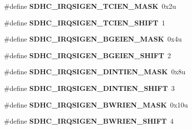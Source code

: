 \begin{DoxyCompactItemize}
\item 
\hypertarget{group___s_d_h_c___register___masks_ga18f4e41f80857c3a86c3ee99dad7fef0}{}\#define {\bfseries S\+D\+H\+C\+\_\+\+I\+R\+Q\+S\+I\+G\+E\+N\+\_\+\+T\+C\+I\+E\+N\+\_\+\+M\+A\+S\+K}~0x2u\label{group___s_d_h_c___register___masks_ga18f4e41f80857c3a86c3ee99dad7fef0}

\item 
\hypertarget{group___s_d_h_c___register___masks_ga6725fe5d247936a430d035b3860ae9f9}{}\#define {\bfseries S\+D\+H\+C\+\_\+\+I\+R\+Q\+S\+I\+G\+E\+N\+\_\+\+T\+C\+I\+E\+N\+\_\+\+S\+H\+I\+F\+T}~1\label{group___s_d_h_c___register___masks_ga6725fe5d247936a430d035b3860ae9f9}

\item 
\hypertarget{group___s_d_h_c___register___masks_ga56ccc2a22e90f8d92cf3a7ad63791861}{}\#define {\bfseries S\+D\+H\+C\+\_\+\+I\+R\+Q\+S\+I\+G\+E\+N\+\_\+\+B\+G\+E\+I\+E\+N\+\_\+\+M\+A\+S\+K}~0x4u\label{group___s_d_h_c___register___masks_ga56ccc2a22e90f8d92cf3a7ad63791861}

\item 
\hypertarget{group___s_d_h_c___register___masks_ga4a14bf5315dcb669dc529920384cdf97}{}\#define {\bfseries S\+D\+H\+C\+\_\+\+I\+R\+Q\+S\+I\+G\+E\+N\+\_\+\+B\+G\+E\+I\+E\+N\+\_\+\+S\+H\+I\+F\+T}~2\label{group___s_d_h_c___register___masks_ga4a14bf5315dcb669dc529920384cdf97}

\item 
\hypertarget{group___s_d_h_c___register___masks_ga9414ef10609a933fd60a109700f44498}{}\#define {\bfseries S\+D\+H\+C\+\_\+\+I\+R\+Q\+S\+I\+G\+E\+N\+\_\+\+D\+I\+N\+T\+I\+E\+N\+\_\+\+M\+A\+S\+K}~0x8u\label{group___s_d_h_c___register___masks_ga9414ef10609a933fd60a109700f44498}

\item 
\hypertarget{group___s_d_h_c___register___masks_gaafe7e328f182b268af1b86b90f8430c8}{}\#define {\bfseries S\+D\+H\+C\+\_\+\+I\+R\+Q\+S\+I\+G\+E\+N\+\_\+\+D\+I\+N\+T\+I\+E\+N\+\_\+\+S\+H\+I\+F\+T}~3\label{group___s_d_h_c___register___masks_gaafe7e328f182b268af1b86b90f8430c8}

\item 
\hypertarget{group___s_d_h_c___register___masks_ga127a20751da5c0a3b1db2619fd29a5bf}{}\#define {\bfseries S\+D\+H\+C\+\_\+\+I\+R\+Q\+S\+I\+G\+E\+N\+\_\+\+B\+W\+R\+I\+E\+N\+\_\+\+M\+A\+S\+K}~0x10u\label{group___s_d_h_c___register___masks_ga127a20751da5c0a3b1db2619fd29a5bf}

\item 
\hypertarget{group___s_d_h_c___register___masks_ga5a0a6e7cdb390a6254c3c037d4ea241c}{}\#define {\bfseries S\+D\+H\+C\+\_\+\+I\+R\+Q\+S\+I\+G\+E\+N\+\_\+\+B\+W\+R\+I\+E\+N\+\_\+\+S\+H\+I\+F\+T}~4\label{group___s_d_h_c___register___masks_ga5a0a6e7cdb390a6254c3c037d4ea241c}


\end{DoxyCompactItemize}
